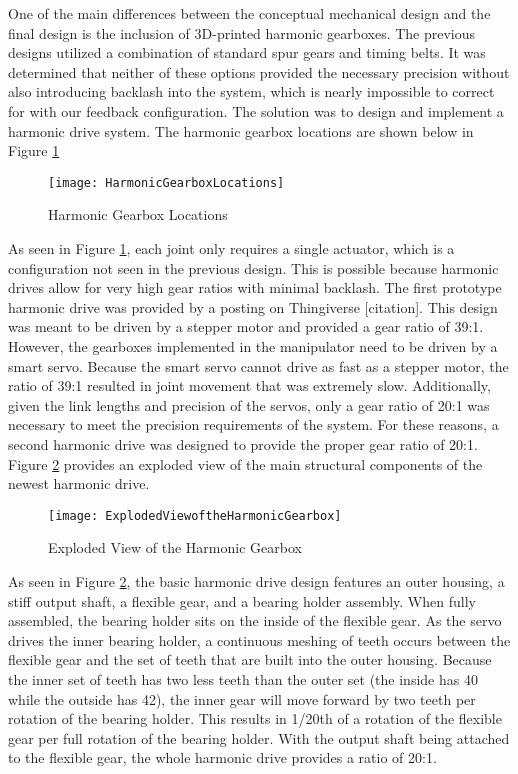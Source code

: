 One of the main differences between the conceptual mechanical design and the final design is the inclusion of 3D-printed harmonic gearboxes. The previous designs utilized a combination of standard spur gears and timing belts. It was determined that neither of these options provided the necessary precision without also introducing backlash into the system, which is nearly impossible to correct for with our feedback configuration. The solution was to design and implement a harmonic drive system. The harmonic gearbox locations are shown below in Figure \ref{fig:HarmonicGearboxLocations}

\begin{figure}[htp]
  \centering
  \texttt{[image: HarmonicGearboxLocations]}
  \caption{Harmonic Gearbox Locations}
  \label{fig:HarmonicGearboxLocations}
\end{figure}

As seen in Figure \ref{fig:HarmonicGearboxLocations}, each joint only requires a single actuator, which is a configuration not seen in the previous design. This is possible because harmonic drives allow for very high gear ratios with minimal backlash. The first prototype harmonic drive was provided by a posting on Thingiverse [citation]. This design was meant to be driven by a stepper motor and provided a gear ratio of 39:1. However, the gearboxes implemented in the manipulator need to be driven by a smart servo. Because the smart servo cannot drive as fast as a stepper motor, the ratio of 39:1 resulted in joint movement that was extremely slow. Additionally, given the link lengths and precision of the servos, only a gear ratio of 20:1 was necessary to meet the precision requirements of the system. For these reasons, a second harmonic drive was designed to provide the proper gear ratio of 20:1. Figure \ref{fig:ExplodedViewoftheHarmonicGearbox} provides an exploded view of the main structural components of the newest harmonic drive.

\begin{figure}[htp]
  \centering
  \texttt{[image: ExplodedViewoftheHarmonicGearbox]}
  \caption{Exploded View of the Harmonic Gearbox}
  \label{fig:ExplodedViewoftheHarmonicGearbox}
\end{figure}

As seen in Figure \ref{fig:ExplodedViewoftheHarmonicGearbox}, the basic harmonic drive design features an outer housing, a stiff output shaft, a flexible gear, and a bearing holder assembly. When fully assembled, the bearing holder sits on the inside of the flexible gear. As the servo drives the inner bearing holder, a continuous meshing of teeth occurs between the flexible gear and the set of teeth that are built into the outer housing. Because the inner set of teeth has two less teeth than the outer set (the inside has 40 while the outside has 42), the inner gear will move forward by two teeth per rotation of the bearing holder. This results in 1/20th of a rotation of the flexible gear per full rotation of the bearing holder. With the output shaft being attached to the flexible gear, the whole harmonic drive provides a ratio of 20:1.

